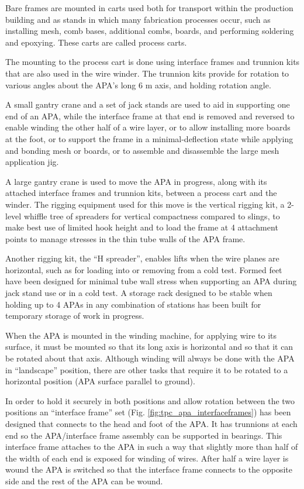 Bare frames are mounted in carts used both for transport within the production building and as stands in which many fabrication processes occur, such as installing mesh, comb bases, additional combs, boards, and performing soldering and epoxying. These carts are called process carts. 

The mounting to the process cart is done using interface frames and trunnion kits that are also used in the wire winder. The trunnion kits provide for rotation to various angles about the APA's long 6 m axis, and holding rotation angle.

A small gantry crane and a set of jack stands are used to aid in supporting one end of an APA, while the interface frame at that end is removed and reversed to enable winding the other half of a wire layer, or to allow installing more boards at the foot, or to support the frame in a minimal-deflection state while applying and bonding mesh or boards, or to assemble and disassemble the large mesh application jig. 

A large gantry crane is used to move the APA in progress, along with its attached interface frames and trunnion kits, between a process cart and the winder. The rigging equipment used for this move is the vertical rigging kit, a 2-level whiffle tree of spreaders for vertical compactness compared to slings, to make best use of limited hook height and to load the frame at 4 attachment points to manage stresses in the thin tube walls of the APA frame. 

Another rigging kit, the ``H spreader'', enables lifts when the wire planes are horizontal, such as for loading into or removing from a cold test. Formed feet have been designed for minimal tube wall stress when supporting an APA during jack stand use or in a cold test. A storage rack designed to be stable when holding up to 4 APAs in any combination of stations has been built for temporary storage of work in progress.

When the APA is mounted in the winding machine, for applying wire to its surface, it must be mounted so that its long axis is horizontal and so that it can be rotated about that axis.  Although winding will always be done with the APA in ``landscape'' position, there are other tasks that require it to be rotated to a horizontal position (APA surface parallel to ground).

In order to hold it securely in both positions and allow rotation between the two positions an ``interface frame'' set (Fig. \ref{fig:tpc_apa_interfaceframes}) has been designed that connects to the head and foot of the APA.  It has trunnions at each end so the APA/interface frame assembly can be supported in bearings.  This interface frame attaches to the APA in such a way that slightly more than half of the width of each end is exposed for winding of wires.  After half a wire layer is wound the APA is switched so that the interface frame connects to the opposite side and the rest of the APA can be wound.

